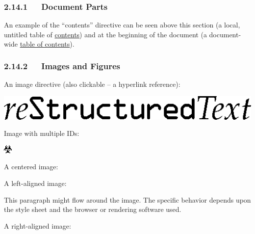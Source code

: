 \documentclass[a4paper]{article}
\begin{document}
\subsubsection{2.14.1   Document Parts%
  \label{document-parts}%
}

An example of the “contents” directive can be seen above this section
(a local, untitled table of \hyperref[contents]{contents}) and at the beginning of the
document (a document-wide \hyperref[table-of-contents]{table of contents}).


\subsubsection{2.14.2   Images and Figures%
  \label{images-and-figures}%
}

An image directive (also clickable – a hyperlink reference):

\hyperref[directives]{\includegraphics[width=0.700\linewidth]{../../../docs/user/rst/images/title.png}}

Image with multiple IDs:

\includegraphics{../../../docs/user/rst/images/biohazard.png}
\label{image-target-3}\label{image-target-2}\label{image-target-1}

A centered image:

\noindent{}

A left-aligned image:


This paragraph might flow around the image.
The specific behavior depends upon the style sheet and
the browser or rendering software used.

A right-aligned image:

\end{document}
